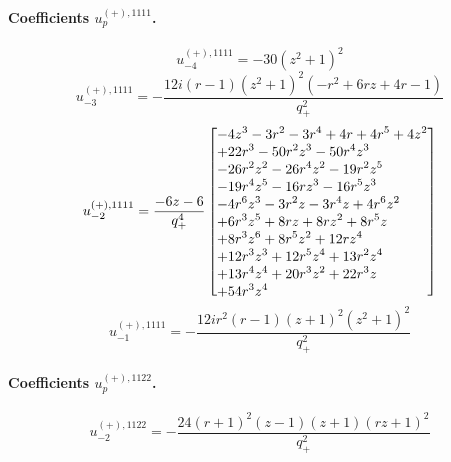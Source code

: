 \documentclass[11pt,a4paper]{article}
\begin{document}
\paragraph{Coefficients $u_p^{(+),1111}$.}
\begin{equation}
u_{-4}^{(+),1111}=- 30 \left(z^{2} + 1\right)^{2}
\label{eq:cat-auxiliary-plus-1111-m4}
\end{equation}
\begin{equation}
u_{-3}^{(+),1111}=- \frac{12 i \left(r - 1\right) \left(z^{2} + 1\right)^{2} \left(- r^{2} + 6 r z + 4 r - 1\right)}{q_{+}^{2}}
\label{eq:cat-auxiliary-plus-1111-m3}
\end{equation}
\begin{equation}
u_{-2}^{(+),1111}=\frac{- 6 z - 6}{q_{+}^{4}}\left[\vcenter{\hbox{\shortstack[l]{$\displaystyle  - 4 z^{3} - 3 r^{2} - 3 r^{4} + 4 r + 4 r^{5} + 4 z^{2}$\\
$\displaystyle  + 22 r^{3} - 50 r^{2} z^{3} - 50 r^{4} z^{3}$\\
$\displaystyle  - 26 r^{2} z^{2} - 26 r^{4} z^{2} - 19 r^{2} z^{5}$\\
$\displaystyle  - 19 r^{4} z^{5} - 16 r z^{3} - 16 r^{5} z^{3}$\\
$\displaystyle  - 4 r^{6} z^{3} - 3 r^{2} z - 3 r^{4} z + 4 r^{6} z^{2}$\\
$\displaystyle  + 6 r^{3} z^{5} + 8 r z + 8 r z^{2} + 8 r^{5} z$\\
$\displaystyle  + 8 r^{3} z^{6} + 8 r^{5} z^{2} + 12 r z^{4}$\\
$\displaystyle  + 12 r^{3} z^{3} + 12 r^{5} z^{4} + 13 r^{2} z^{4}$\\
$\displaystyle  + 13 r^{4} z^{4} + 20 r^{3} z^{2} + 22 r^{3} z$\\
$\displaystyle  + 54 r^{3} z^{4}$}}}\right]
\label{eq:cat-auxiliary-plus-1111-m2}
\end{equation}
\begin{equation}
u_{-1}^{(+),1111}=- \frac{12 i r^{2} \left(r - 1\right) \left(z + 1\right)^{2} \left(z^{2} + 1\right)^{2}}{q_{+}^{2}}
\label{eq:cat-auxiliary-plus-1111-m1}
\end{equation}
\paragraph{Coefficients $u_p^{(+),1122}$.}
\begin{equation}
u_{-2}^{(+),1122}=- \frac{24 \left(r + 1\right)^{2} \left(z - 1\right) \left(z + 1\right) \left(r z + 1\right)^{2}}{q_{+}^{2}}
\label{eq:cat-auxiliary-plus-1122-m2}
\end{equation}
\end{document}
